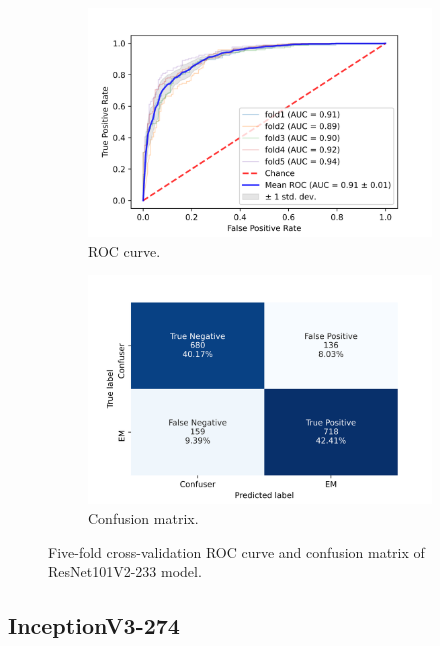 \begin{figure}[h!]
	\centering
	\begin{subfigure}[b]{0.49\textwidth}
		\centering
		\includegraphics[width=\textwidth,keepaspectratio]{images/Supplement4/image90.png}
		\caption{ROC curve.}
	\end{subfigure}
	\hfill
	\begin{subfigure}[b]{0.49\textwidth}
		\centering
		\includegraphics[width=\textwidth,keepaspectratio]{images/Supplement4/image96.png}
		\caption{Confusion matrix.}
	\end{subfigure}
	\caption{Five-fold cross-validation ROC curve and confusion matrix of ResNet101V2-233 model.}
\end{figure}

\vfill\clearpage
\subsection{InceptionV3-274}

